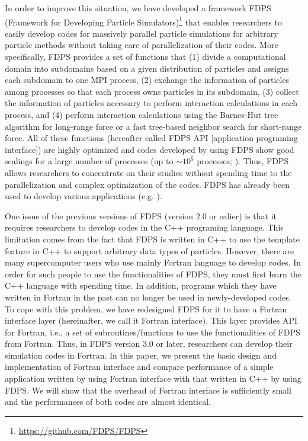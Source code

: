 \documentclass[proof,useamsfonts]{pasj01}
\begin{document}
In order to improve this situation, we have developed a framework FDPS (Framework for Developing Particle Simulators)\footnote{\url{https://github.com/FDPS/FDPS}} \citep{2015FDPS,iwasawa16:_implem_fdps} that enables researchers to easily develop codes for massively parallel particle simulations for arbitrary particle methods without taking care of parallelization of their codes. More specifically, FDPS provides a set of functions that (1) divide a computational domain into subdomains based on a given distribution of particles and assigns each subdomain to one MPI process, (2) exchange the information of particles among processes so that each process owns particles in its subdomain, (3) collect the information of particles necessary to perform interaction calculations in each process, and (4) perform interaction calculations using the Barnes-Hut tree algorithm for long-range force or a fast tree-based neighbor search for short-range force. All of these functions (hereafter called FDPS API [application programing interface]) are highly optimized and codes developed by using FDPS show good scalings for a large number of processes (up to $\sim 10^{5}$ processes; \citet{iwasawa16:_implem_fdps}). Thus, FDPS allows researchers to concentrate on their studies without spending time to the parallelization and complex optimization of the codes. FDPS has already been used to develop various applications (e.g. \cite{hosono16:_a_comparison_of_sph,hosono16:_the_giant_impact,hosono17:_unconv_of_very_large,michikoshi17a:_simulat_smallest,tanikawa17:_does_explo_nucl,iwasawa17:_pentacle_parallelized,tanikawa18:_tidal_double_detona,tanikawa18:_high_resolution_hydro}).

One issue of the previous versions of FDPS (version 2.0 or ealier) is that it requires researchers to develop codes in the C++ programing language. This limitation comes from the fact that FDPS is written in C++ to use the template feature in C++ to support arbitrary data types of particles. However, there are many supercomputer users who use mainly Fortran language to develop codes. In order for such people to use the functionalities of FDPS, they must first learn the C++ language with spending time. In addition, programs which they have written in Fortran in the past can no longer be used in newly-developed codes. To cope with this problem, we have redesigned FDPS for it to have a Fortran interface layer (hereinafter, we call it Fortran interface). This layer provides API for Fortran, i.e., a set of subroutines/functions to use the functionalities of FDPS from Fortran. Thus, in FDPS version 3.0 or later, researchers can develop their simulation codes in Fortran. In this paper, we present the basic design and implementation of Fortran interface and compare performance of a simple application written by using Fortran interface with that written in C++ by using FDPS. We will show that the overhead of Fortran interface is sufficiently small and the performances of both codes are almost identical.
\end{document}
